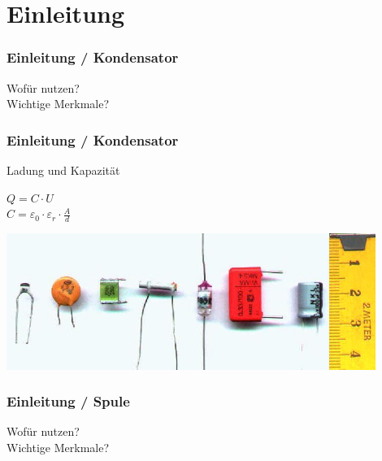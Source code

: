 

\subtitle{Technik Klasse A 03: \\
          Kondensator, Spule, Transformator \\[2em]}
\date{Stand 11.01.2016}


\section*{Einleitung}

\begin{frame}
    \frametitle{Einleitung / Kondensator}
    \begin{center}
        \Large{Wofür nutzen?}\\
        \Large{Wichtige Merkmale?}         
    \end{center}
\end{frame}

\begin{frame}
  \frametitle{Einleitung / Kondensator}
  \begin{block}{Ladung und Kapazität}
    \begin{center}
      \Large{$Q = C \cdot U$}\\
      \Large{$C= \varepsilon_{0} \cdot \varepsilon_{r} \cdot \frac{A}{d}$}
    \end{center}
  \end{block}
  \begin{center}
    \includegraphics[width=0.9\textwidth,height=0.6\textheight,keepaspectratio]{e05/Kondensator02.jpg}
    \tiny \hyperlink{refs}{\cite{wc}}
  \end{center}
\end{frame}


\begin{frame}
    \frametitle{Einleitung / Spule}
    \begin{center}
        \Large{Wofür nutzen?}\\
        \Large{Wichtige Merkmale?}         
    \end{center}
\end{frame}

